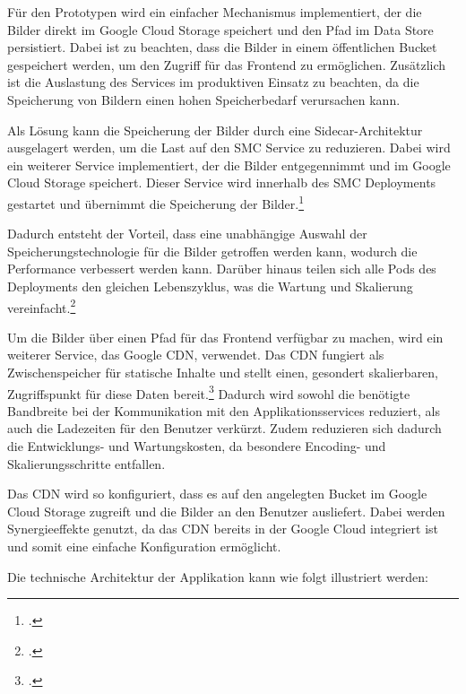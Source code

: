 Für den Prototypen wird ein einfacher Mechanismus implementiert, der die Bilder direkt im Google Cloud Storage speichert und den Pfad im Data Store persistiert.
Dabei ist zu beachten, dass die Bilder in einem öffentlichen Bucket gespeichert werden, um den Zugriff für das Frontend zu ermöglichen.
Zusätzlich ist die Auslastung des Services im produktiven Einsatz zu beachten, da die Speicherung von Bildern einen hohen Speicherbedarf verursachen kann.

Als Lösung kann die Speicherung der Bilder durch eine Sidecar-Architektur ausgelagert werden, um die Last auf den \ac{SMC} Service zu reduzieren.
Dabei wird ein weiterer Service implementiert, der die Bilder entgegennimmt und im Google Cloud Storage speichert.
Dieser Service wird innerhalb des \ac{SMC} Deployments gestartet und übernimmt die Speicherung der Bilder.\footcite{microsoft_sidecar_pattern}

Dadurch entsteht der Vorteil, dass eine unabhängige Auswahl der Speicherungstechnologie für die Bilder getroffen werden kann, wodurch die Performance verbessert werden kann.
Darüber hinaus teilen sich alle Pods des Deployments den gleichen Lebenszyklus, was die Wartung und Skalierung vereinfacht.\footcite{kubernetes_sidecar_containers}

Um die Bilder über einen Pfad für das Frontend verfügbar zu machen, wird ein weiterer Service, das Google \ac{CDN}, verwendet.
Das CDN fungiert als Zwischenspeicher für statische Inhalte und stellt einen, gesondert skalierbaren, Zugriffspunkt für diese Daten bereit.\footcite{google_cloud_cdn_overview}
Dadurch wird sowohl die benötigte Bandbreite bei der Kommunikation mit den Applikationsservices reduziert, als auch die Ladezeiten für den Benutzer verkürzt.
Zudem reduzieren sich dadurch die Entwicklungs- und Wartungskosten, da besondere Encoding- und Skalierungsschritte entfallen.

Das \ac{CDN} wird so konfiguriert, dass es auf den angelegten Bucket im Google Cloud Storage zugreift und die Bilder an den Benutzer ausliefert.
Dabei werden Synergieeffekte genutzt, da das \ac{CDN} bereits in der Google Cloud integriert ist und somit eine einfache Konfiguration ermöglicht.

Die technische Architektur der Applikation kann wie folgt illustriert werden:

